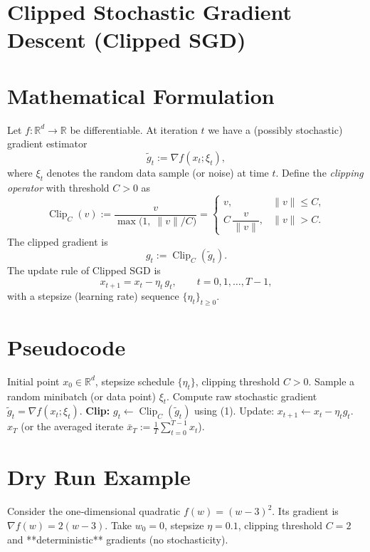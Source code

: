 \documentclass[11pt]{article}
\newcommand{\R}{\mathbb{R}}
\begin{document}
\section*{Clipped Stochastic Gradient Descent (Clipped SGD)}

\section*{Mathematical Formulation}
Let $f:\R^{d}\rightarrow\R$ be differentiable.  
At iteration $t$ we have a (possibly stochastic) gradient estimator 
\[
\tilde g_t:=\nabla f(x_t;\xi_t),
\]
where $\xi_t$ denotes the random data sample (or noise) at time $t$.  
Define the \emph{clipping operator} with threshold $C>0$ as
\[
\operatorname{Clip}_C(v):=
\frac{v}{\max\!\bigl(1,\; \|v\|/C\bigr)}=
\begin{cases}
v, &\|v\|\le C,\\[4pt]
C\,\dfrac{v}{\|v\|}, &\|v\|>C .
\end{cases}
\tag{1}
\]
The clipped gradient is
\[
g_t:=\operatorname{Clip}_C(\tilde g_t). \tag{2}
\]
The update rule of Clipped SGD is
\[
x_{t+1}=x_t-\eta_t\, g_t, \qquad t=0,1,\dots ,T-1, \tag{3}
\]
with a stepsize (learning rate) sequence $\{\eta_t\}_{t\ge0}$.

\section*{Pseudocode}
\begin{algorithm}[H]
\caption{Clipped Stochastic Gradient Descent}
\begin{algorithmic}[1]
\REQUIRE Initial point $x_0\in\R^d$, stepsize schedule $\{\eta_t\}$, clipping threshold $C>0$.
    \STATE Sample a random minibatch (or data point) $\xi_t$.
    \STATE Compute raw stochastic gradient $\tilde g_t=\nabla f(x_t;\xi_t)$.
    \STATE \textbf{Clip:} $g_t \gets \operatorname{Clip}_C(\tilde g_t)$ using (1).
    \STATE Update: $x_{t+1}\gets x_t-\eta_t g_t$.
\ENDFOR
\RETURN $x_T$ (or the averaged iterate $\bar x_T:=\frac1T\sum_{t=0}^{T-1}x_t$).
\end{algorithmic}
\end{algorithm}

\section*{Dry Run Example}
Consider the one‑dimensional quadratic $f(w)=(w-3)^2$.  
Its gradient is $\nabla f(w)=2(w-3)$.  
Take $w_0=0$, stepsize $\eta=0.1$, clipping threshold $C=2$ and **deterministic** gradients (no stochasticity).
\end{document}

